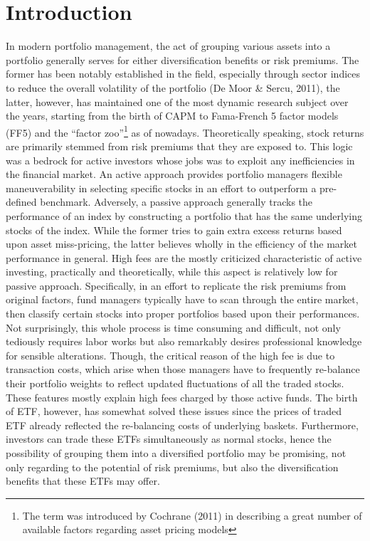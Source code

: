 \section{Introduction}

In modern portfolio management, the act of grouping various assets into a portfolio generally serves for either diversification benefits or risk premiums. The former has been notably established in the field, especially through sector indices to reduce the overall volatility of the portfolio (De Moor & Sercu, 2011), the latter, however, has maintained one of the most dynamic research subject over the years, starting from the birth of CAPM to Fama-French 5 factor models (FF5) and the “factor zoo”\footnote{The term was introduced by Cochrane (2011) in describing a great number of available factors regarding asset pricing models}  as of nowadays.
Theoretically speaking, stock returns are primarily stemmed from risk premiums that they are exposed to. This logic was a bedrock for active investors whose jobs was to exploit any inefficiencies in the financial market. An active approach provides portfolio managers flexible maneuverability in selecting specific stocks in an effort to outperform a pre-defined benchmark. Adversely, a passive approach generally tracks the performance of an index by constructing a portfolio that has the same underlying stocks of the index. While the former tries to gain extra excess returns based upon asset miss-pricing, the latter believes wholly in the efficiency of the market performance in general. 
High fees are the mostly criticized characteristic of active investing, practically and theoretically, while this aspect is relatively low for passive approach. Specifically, in an effort to replicate the risk premiums from original factors, fund managers typically have to scan through the entire market, then classify certain stocks into proper portfolios based upon their performances. Not surprisingly, this whole process is time consuming and difficult, not only tediously requires labor works but also remarkably desires professional knowledge for sensible alterations. Though, the critical reason of the high fee is due to transaction costs, which arise when those managers have to frequently re-balance their portfolio weights to reflect updated fluctuations of all the traded stocks. These features mostly explain high fees charged by those active funds. The birth of ETF, however, has somewhat solved these issues since the prices of traded ETF already reflected the re-balancing costs of underlying baskets. Furthermore, investors can trade these ETFs simultaneously as normal stocks, hence the possibility of grouping them into a diversified portfolio may be promising, not only regarding to the potential of risk premiums, but also the diversification benefits that these ETFs may offer.
